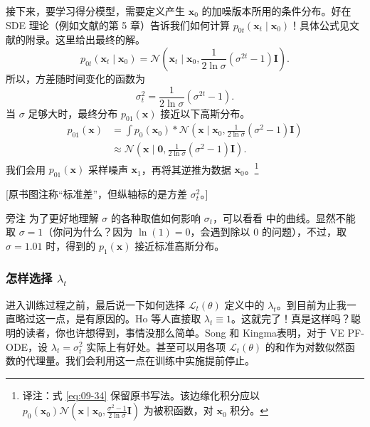 接下来，要学习得分模型，需要定义产生 $\mathbf x_0$ 的加噪版本所用的条件分布。好在 SDE 理论（例如文献的第 5 章）告诉我们如何计算 $p_{0t}(\mathbf x_t\mid\mathbf x_0)$！具体公式见文献的附录。这里给出最终的解。
\begin{equation}
  p_{0t}(\mathbf x_t\mid\mathbf x_0)=
  \mathcal N\left(\mathbf x_t\mid\mathbf x_0,
    \frac{1}{2\ln\sigma}(\sigma^{2t}-1)\mathbf I\right).
  \tag{9.32}\label{eq:09-32}
\end{equation}
所以，方差随时间变化的函数为
\begin{equation}
  \sigma_t^2=\frac{1}{2\ln\sigma}(\sigma^{2t}-1).
  \tag{9.33}\label{eq:09-33}
\end{equation}
当 $\sigma$ 足够大时，最终分布 $p_{01}(\mathbf x)$ 接近以下高斯分布。
\begin{align}
  p_{01}(\mathbf x)
    &=\int p_0(\mathbf x_0)*\mathcal N\left(\mathbf x\mid\mathbf x_0,
      \frac{1}{2\ln\sigma}(\sigma^2-1)\mathbf I\right)
      \tag{9.34}\label{eq:09-34}\\
    &\approx\mathcal N\left(\mathbf x\mid\mathbf 0,
      \frac{1}{2\ln\sigma}(\sigma^2-1)\mathbf I\right).
      \tag{9.35}\label{eq:09-35}
\end{align}
我们会用 $p_{01}(\mathbf x)$ 采样噪声 $\mathbf x_1$，再将其逆推为数据 $\mathbf x_0$。\footnote{译注：式 \eqref{eq:09-34} 保留原书写法。该边缘化积分应以 $p_0(\mathbf x_0)\mathcal N(\mathbf x\mid\mathbf x_0,\frac{\sigma^2-1}{2\ln\sigma}\mathbf I)$ 为被积函数，对 $\mathbf x_0$ 积分。}

[原书图注称“标准差”，但纵轴标的是方差 $\sigma_t^2$。]

\begin{booknote}{旁注}
为了更好地理解 $\sigma$ 的各种取值如何影响 $\sigma_t$，可以看看 中的曲线。显然不能取 $\sigma=1$（你问为什么？因为 $\ln(1)=0$，会遇到除以 0 的问题），不过，取 $\sigma=1.01$ 时，得到的 $p_1(\mathbf x)$ 接近标准高斯分布。
\end{booknote}

\subsubsection{怎样选择 \texorpdfstring{$\lambda_t$}{λₜ}}

进入训练过程之前，最后说一下如何选择 $\mathcal L_t(\theta)$ 定义中的 $\lambda_t$。到目前为止我一直略过这一点，是有原因的。Ho 等人直接取 $\lambda_t\equiv1$。这就完了！真是这样吗？聪明的读者，你也许想得到，事情没那么简单。Song 和 Kingma表明，对于 VE PF-ODE，设 $\lambda_t=\sigma_t^2$ 实际上有好处。甚至可以用各项 $\mathcal L_t(\theta)$ 的和作为对数似然函数的代理量。我们会利用这一点在训练中实施提前停止。

